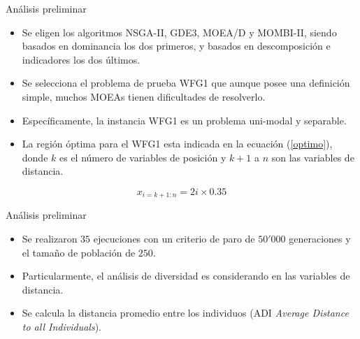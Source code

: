 \documentclass{beamer}
\begin{document}
\begin{frame}{Análisis preliminar}
\begin{itemize}
\justifying
\item Se eligen los algoritmos NSGA-II, GDE3, MOEA/D y MOMBI-II, siendo basados en dominancia los dos primeros, y basados en descomposición e indicadores los dos últimos.
\justifying
\item Se selecciona el problema de prueba WFG1 que aunque posee una definición simple, muchos MOEAs tienen dificultades de resolverlo.
\justifying
\item Específicamente, la instancia WFG1 es un problema uni-modal y separable.
\justifying
\item La región óptima para el WFG1 esta indicada en la ecuación (\ref{optimo}), donde $k$ es el número de variables de posición y $k+1$ a $n$ son las variables de distancia.
\end{itemize}
\begin{equation} \label{optimo}
	x_{i=k+1:n} = 2i \times 0.35
\end{equation}
\end{frame}

\begin{frame}{Análisis preliminar}
\begin{itemize}
\justifying
\item Se realizaron $35$ ejecuciones con un criterio de paro de $50'000$ generaciones y el tamaño de población de $250$.
\justifying
\item Particularmente, el análisis de diversidad es considerando en las variables de distancia.
\justifying
\item Se calcula la distancia promedio entre los individuos (ADI \textit{Average Distance to all Individuals}).
\end{itemize}
\end{frame}
\end{document}
